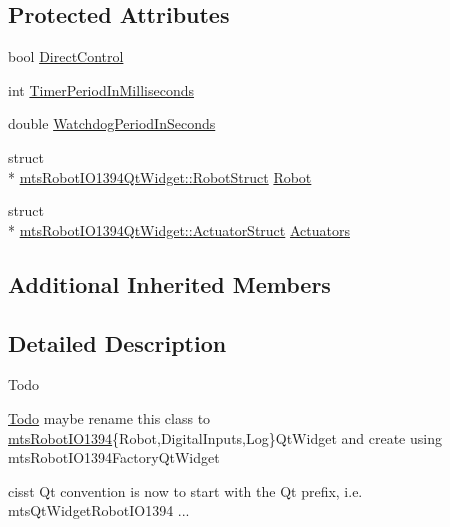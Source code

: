 \subsection*{Protected Attributes}
\begin{DoxyCompactItemize}
\item 
bool \hyperlink{classmts_robot_i_o1394_qt_widget_ae0e6af9087d5457633b4d42a93c63bcd}{Direct\-Control}
\item 
int \hyperlink{classmts_robot_i_o1394_qt_widget_a4fa3dd1b6769a8a4fc0c51b77dbf3413}{Timer\-Period\-In\-Milliseconds}
\item 
double \hyperlink{classmts_robot_i_o1394_qt_widget_a65cefe450636651de5c971d33119c6db}{Watchdog\-Period\-In\-Seconds}
\item 
struct \\*
\hyperlink{structmts_robot_i_o1394_qt_widget_1_1_robot_struct}{mts\-Robot\-I\-O1394\-Qt\-Widget\-::\-Robot\-Struct} \hyperlink{classmts_robot_i_o1394_qt_widget_ade381e042472af642876b731415a18af}{Robot}
\item 
struct \\*
\hyperlink{structmts_robot_i_o1394_qt_widget_1_1_actuator_struct}{mts\-Robot\-I\-O1394\-Qt\-Widget\-::\-Actuator\-Struct} \hyperlink{classmts_robot_i_o1394_qt_widget_a68401b5200788155540f952697487364}{Actuators}
\end{DoxyCompactItemize}
\subsection*{Additional Inherited Members}


\subsection{Detailed Description}
\begin{DoxyRefDesc}{Todo}
\item[\hyperlink{todo__todo000021}{Todo}]maybe rename this class to \hyperlink{classmts_robot_i_o1394}{mts\-Robot\-I\-O1394}\{Robot,Digital\-Inputs,Log\}Qt\-Widget and create using mts\-Robot\-I\-O1394\-Factory\-Qt\-Widget 

cisst Qt convention is now to start with the Qt prefix, i.\-e. mts\-Qt\-Widget\-Robot\-I\-O1394 ... \end{DoxyRefDesc}


